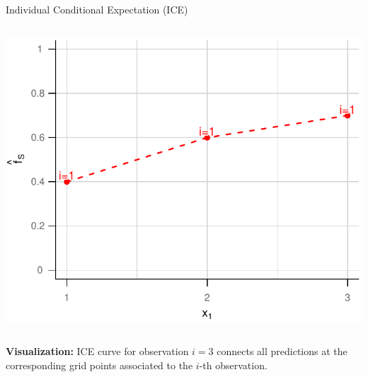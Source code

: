 \documentclass[11pt,compress,t,notes=noshow, xcolor=table]{beamer}
\begin{document}
\begin{vbframe}{Individual Conditional Expectation (ICE)}
\begin{columns}[T]
\begin{column}{0.45\textwidth}
\begin{center}
\includegraphics[page=3, width=\textwidth]{figure_man/ICE}
\end{center}

\end{column}
\end{columns}
\vspace*{\topsep}

\textbf{Visualization:} ICE curve for observation $i=3$ connects all predictions at the corresponding grid points associated to the $i$-th observation.
\end{vbframe}

\endlecture
\end{document}
